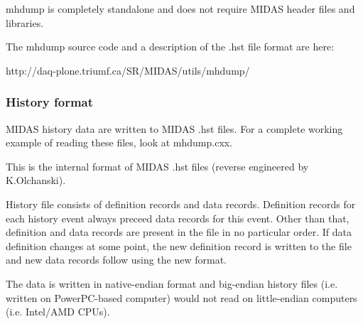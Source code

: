 mhdump is completely standalone and does not require MIDAS header files and libraries. 


The mhdump source code and a description of the .hst file format are here: 
\begin{DoxyCode}
http://daq-plone.triumf.ca/SR/MIDAS/utils/mhdump/
\end{DoxyCode}


\par


\par


\label{F_History_logging_idx_History_file_format}
\hypertarget{F_History_logging_idx_History_file_format}{}
 \hypertarget{F_History_logging_F_History_format}{}\subsubsection{History format}\label{F_History_logging_F_History_format}
MIDAS history data are written to MIDAS .hst files. For a complete working example of reading these files, look at mhdump.cxx.

This is the internal format of MIDAS .hst files (reverse engineered by K.Olchanski).

History file consists of definition records and data records. Definition records for each history event always preceed data records for this event. Other than that, definition and data records are present in the file in no particular order. If data definition changes at some point, the new definition record is written to the file and new data records follow using the new format.

The data is written in native-\/endian format and big-\/endian history files (i.e. written on PowerPC-\/based computer) would not read on little-\/endian computers (i.e. Intel/AMD CPUs).

